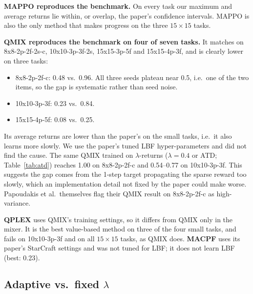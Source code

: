 \textbf{MAPPO reproduces the benchmark.} On every task our maximum and average returns lie within,
or overlap, the paper's confidence intervals. MAPPO is also the only method that makes progress
on the three $15\times15$ tasks.

\textbf{QMIX reproduces the benchmark on four of seven tasks.} It matches on 8x8-2p-2f-2s-c,
10x10-3p-3f-2s, 15x15-3p-5f and 15x15-4p-3f, and is clearly lower on three tasks:
\begin{itemize}
  \item 8x8-2p-2f-c: 0.48 vs.\ 0.96. All three seeds plateau near 0.5, i.e.\ one of the two items,
        so the gap is systematic rather than seed noise.
  \item 10x10-3p-3f: 0.23 vs.\ 0.84.
  \item 15x15-4p-5f: 0.08 vs.\ 0.25.
\end{itemize}
Its average returns are lower than the paper's on the small tasks, i.e.\ it also learns more
slowly. We use the paper's tuned LBF hyper-parameters and did not find the cause. The same QMIX
trained on $\lambda$-returns ($\lambda=0.4$ or ATD; Table~\ref{tab:atd}) reaches 1.00 on
8x8-2p-2f-c and 0.54--0.77 on 10x10-3p-3f. This suggests the gap comes from the 1-step target
propagating the sparse reward too slowly, which an implementation detail not fixed by the paper
could make worse. Papoudakis et al.\ themselves flag their QMIX result on 8x8-2p-2f-c as
high-variance.

\textbf{QPLEX} uses QMIX's training settings, so it differs from QMIX only in the mixer. It is the
best value-based method on three of the four small tasks, and fails on 10x10-3p-3f and on all
$15\times15$ tasks, as QMIX does. \textbf{MACPF} uses its paper's StarCraft settings and was not
tuned for LBF; it does not learn LBF (best: 0.23).

\subsection{Adaptive vs.\ fixed $\lambda$}

